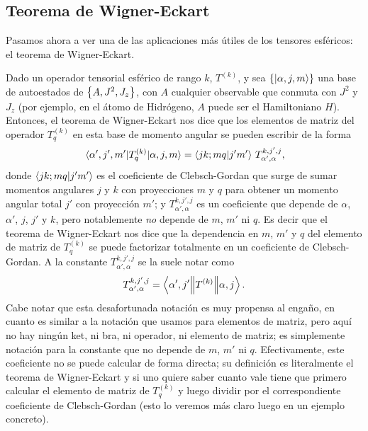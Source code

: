 \documentclass[10pt, a4paper]{article}
\numberwithin{equation}{subsection}
\begin{document}
\subsection{Teorema de Wigner-Eckart}

Pasamos ahora a ver una de las aplicaciones más útiles de los tensores
esféricos: el teorema de Wigner-Eckart.

Dado un operador tensorial esférico de rango $k$, $T^{(k)}$, y sea
$\set{\ket{\alpha,j,m}}$ una base de autoestados de $\set{A, J^2, J_z}$, con
$A$ cualquier observable que conmuta con $J^2$ y $J_z$ (por ejemplo, en el
átomo de Hidrógeno, $A$ puede ser el Hamiltoniano $H$). Entonces, el teorema de
Wigner-Eckart nos dice que los elementos de matriz del operador $T^{(k)}_q$ en
esta base de momento angular se pueden escribir de la forma
\begin{equation} \label{eq:teowe}
  \matrixel{\alpha',j',m'}{T^{(k)}_{q}}{\alpha,j,m} = \braket{jk;mq}{j'm'} \,
  T_{\alpha',\alpha}^{k,j',j},
\end{equation}
donde $\braket{jk;mq}{j'm'}$ es el coeficiente de Clebsch-Gordan que surge de
sumar momentos angulares $j$ y $k$ con proyecciones $m$ y $q$ para obtener un
momento angular total $j'$ con proyección $m'$; y $T_{\alpha',\alpha}^{k,j',j}$
es un coeficiente que depende de $\alpha$, $\alpha'$, $j$, $j'$ y $k$, pero
notablemente \emph{no} depende de $m$, $m'$ ni $q$. Es decir que el teorema de
Wigner-Eckart nos dice que la dependencia en $m$, $m'$ y $q$ del elemento de
matriz de $T^{(k)}_q$ se puede factorizar totalmente en un coeficiente de
Clebsch-Gordan. A la constante $T_{\alpha',\alpha}^{k,j',j}$ se la suele notar
como
\begin{equation}
  T_{\alpha',\alpha}^{k,j',j} = \left\langle{\alpha',j'}\middle\|{T^{(k)}}\middle\|{\alpha,j}\right\rangle.
\end{equation}
Cabe notar que esta desafortunada notación es muy propensa al engaño, en cuanto
es similar a la notación que usamos para elementos de matriz, pero aquí no hay
ningún ket, ni bra, ni operador, ni elemento de matriz; es simplemente notación
para la constante que no depende de $m$, $m'$ ni $q$. Efectivamente, este
coeficiente no se puede calcular de forma directa; su definición es
literalmente el teorema de Wigner-Eckart y si uno quiere saber cuanto vale
tiene que primero calcular el elemento de matriz de $T^{(k)}_q$ y luego dividir
por el correspondiente coeficiente de Clebsch-Gordan (esto lo veremos más claro
luego en un ejemplo concreto).
\end{document}
